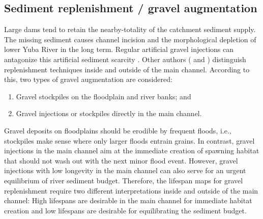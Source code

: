 \subsection{Sediment replenishment / gravel augmentation}\label{sec:gravel}
Large dams tend to retain the nearby-totality of the catchment sediment supply. The missing sediment causes channel incision and the morphological depletion of lower Yuba River in the long term. Regular artificial gravel injections can antagonize this artificial sediment scarcity \citep[e.g.,][]{pasternack10a}. Other authors (\citep{gaeuman08} and \citep{ock13}) distinguish replenishment techniques inside and outside of the main channel. According to this, two types of gravel augmentation are considered:
\begin{enumerate}
	\item Gravel stockpiles on the floodplain and river banks; and
	\item Gravel injections or stockpiles directly in the main channel.
\end{enumerate}
Gravel deposits on floodplains should be erodible by frequent floods, i.e., stockpiles make sense where only larger floods entrain grains. In contrast, gravel injections in the main channel aim at the immediate creation of spawning habitat that should not wash out with the next minor flood event. However, gravel injections with low longevity in the main channel can also serve for an urgent equilibrium of river sediment budget. Therefore, the lifespan maps for gravel replenishment require two different interpretations inside and outside of the main channel: High lifespans are desirable in the main channel for immediate habitat creation and low lifespans are desirable for equilibrating the sediment budget.
